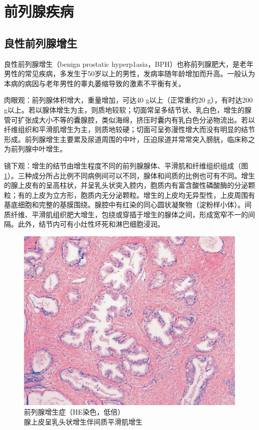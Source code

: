 \section{前列腺疾病}

\subsection{良性前列腺增生}

良性前列腺增生（benign prostatic
hyperp1asia，BPH）也称前列腺肥大，是老年男性的常见疾病，多发生于50岁以上的男性，发病率随年龄增加而升高。一般认为本病的病因与老年男性的睾丸萎缩导致的激素不平衡有关。

肉眼观：前列腺体积增大，重量增加，可达40 g以上（正常重约20
g），有时达200
g以上。若以腺体增生为主，则质地较软；切面常呈多结节状、乳白色，增生的腺管可扩张成大小不等的囊腺腔，类似海绵，挤压时囊内有乳白色分泌物流出。若以纤维组织和平滑肌增生为主，则质地较硬；切面可呈弥漫性增大而没有明显的结节形成。前列腺增生主要累及尿道周围的中叶，压迫尿道并常常突入膀胱，临床称之为前列腺中叶增生。

镜下观：增生的结节由增生程度不同的前列腺腺体、平滑肌和纤维组织组成（图\ref{fig11-18}）。三种成分所占比例不同病例间可以不同，腺体和间质的比例也可有不同。增生的腺上皮有的呈高柱状，并呈乳头状突入腔内，胞质内有富含酸性磷酸酶的分泌颗粒；有的上皮为立方形，胞质内无分泌颗粒。增生的上皮均无异型性，上皮周围有基底细胞和完整的基膜围绕。腺腔中有红染的同心圆状凝聚物（淀粉样小体）。间质纤维、平滑肌组织肥大增生，包绕或穿插于增生的腺体之间，形成宽窄不一的间隔。此外，结节内可有小灶性坏死和淋巴细胞浸润。

\begin{figure}[!htbp]
 \centering
 \includegraphics{./images/Image00206.jpg}
 \captionsetup{justification=centering}
 \caption{前列腺增生症（HE染色，低倍）\\ {\small 腺上皮呈乳头状增生伴间质平滑肌增生}}
\label{fig11-18}
  \end{figure}

